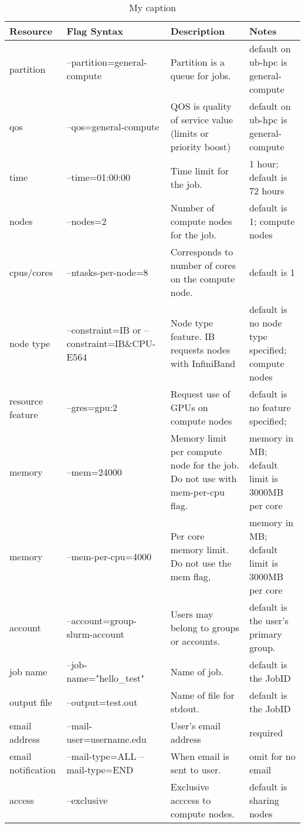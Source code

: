 \documentclass[11pt]{article}
\numberwithin{figure}{section}
\begin{document}
\begin{table}[]
\centering
\caption{My caption}
\label{my-label}
    \begin{tabular}{|l|p{3cm}|p{4cm}|p{4.5cm}|}
\hline
        \textbf{
            Resource }  & \textbf{
    Flag Syntax     }            & \textbf{
    Description}
        & \textbf{
Notes                       }         \\ \hline
partition  & --partition=general-compute & Partition is a queue for jobs.                             & default on ub-hpc is general-compute \\ \hline
qos        & --qos=general-compute       & QOS is quality of service value (limits or priority boost) & default on ub-hpc is general-compute \\ \hline
time       & --time=01:00:00             & Time limit for the job.                                    & 1 hour; default is 72 hours          \\ \hline
nodes      & --nodes=2                   & Number of compute nodes for the job.                       & default is 1;  compute nodes         \\ \hline
cpus/cores & --ntasks-per-node=8         & Corresponds to number of cores on the compute node.        & default is 1                         \\ \hline

node type	& --constraint=IB 
or
        --constraint=IB\&CPU-E564 & 
Node type feature. 
        IB requests nodes with InfiniBand &
default is no node type specified;  compute nodes \\ \hline
        resource feature	& --gres=gpu:2	& Request use of GPUs on compute
        nodes	& default is no feature specified; \\ \hline
        memory &
        --mem=24000	& Memory limit per compute node for the  job.  Do not use
        with mem-per-cpu flag. &	memory in MB; default limit is 3000MB per
        core \\ \hline
        memory	& --mem-per-cpu=4000	& Per core memory limit.  Do not use
        the mem flag, &	memory in MB; default limit is 3000MB per core \\
        \hline
        account	& --account=group-slurm-account	& Users may belong to groups or
        accounts.	& default is the user's primary group. \\ \hline
        job name	& --job-name="hello\_test"	& Name of job.	& default is
        the JobID \\ \hline
        output file	& --output=test.out	& Name of file for stdout.	& default
        is the JobID \\ \hline
        email address	& --mail-user=username\@buffalo.edu	& User's email
        address	& required \\ \hline
        email notification	& --mail-type=ALL
        --mail-type=END &
        When email is sent to user.	& omit for no email \\ \hline
        access	& --exclusive	& Exclusive acccess to compute nodes.	&
        default is sharing nodes \\ \hline


\end{tabular}
\end{table}
\end{document}
